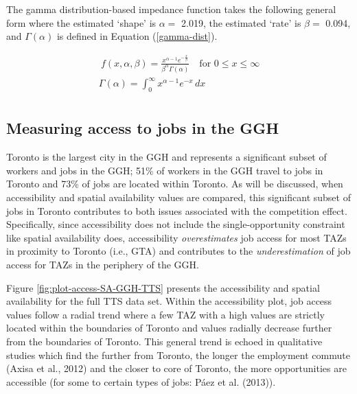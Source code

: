 \documentclass[]{elsarticle} %
\begin{document}
The gamma distribution-based impedance function takes the following
general form where the estimated `shape' is \(\alpha=\) 2.019, the
estimated `rate' is \(\beta =\) 0.094, and \(\Gamma(\alpha)\) is defined
in Equation (\ref{gamma-dist}).

\begin{equation}
\label{gamma-dist}
\begin{array}{l}\ 
f(x, \alpha, \beta) = \frac {x^{\alpha-1}e^{-\frac{x}{\beta}}}{ \beta^{\alpha}\Gamma(\alpha)} \quad \text{for } 0 \leq x \leq \infty\\

\Gamma(\alpha) =  \int_{0}^{\infty} x^{\alpha-1}e^{-x} \,dx\\
\end{array}
\end{equation}

\hypertarget{measuring-access-to-jobs-in-the-ggh}{%
\subsection{Measuring access to jobs in the
GGH}\label{measuring-access-to-jobs-in-the-ggh}}

Toronto is the largest city in the GGH and represents a significant
subset of workers and jobs in the GGH; 51\% of workers in the GGH travel
to jobs in Toronto and 73\% of jobs are located within Toronto. As will
be discussed, when accessibility and spatial availability values are
compared, this significant subset of jobs in Toronto contributes to both
issues associated with the competition effect. Specifically, since
accessibility does not include the single-opportunity constraint like
spatial availability does, accessibility \emph{overestimates} job access
for most TAZs in proximity to Toronto (i.e., GTA) and contributes to the
\emph{underestimation} of job access for TAZs in the periphery of the
GGH.

Figure \ref{fig:plot-access-SA-GGH-TTS} presents the accessibility and
spatial availability for the full TTS data set. Within the accessibility
plot, job access values follow a radial trend where a few TAZ with a
high values are strictly located within the boundaries of Toronto and
values radially decrease further from the boundaries of Toronto. This
general trend is echoed in qualitative studies which find the further
from Toronto, the longer the employment commute (Axisa et al., 2012) and
the closer to core of Toronto, the more opportunities are accessible
(for some to certain types of jobs: Páez et al. (2013)).
\end{document}
